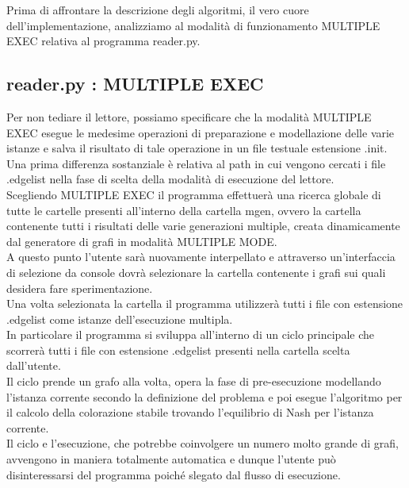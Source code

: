 Prima di affrontare la descrizione degli algoritmi, il vero cuore dell'implementazione, analizziamo al modalità di funzionamento MULTIPLE EXEC relativa al programma reader.py.\\

\subsection{reader.py : MULTIPLE EXEC}
\justify
Per non tediare il lettore, possiamo specificare che la modalità MULTIPLE EXEC esegue le medesime operazioni di preparazione e modellazione delle varie istanze e salva il risultato di tale operazione in un file testuale estensione .init.\\

Una prima differenza sostanziale è relativa al path in cui vengono cercati i file .edgelist nella fase di scelta della modalità di esecuzione del lettore.\\
Scegliendo MULTIPLE EXEC il programma effettuerà una ricerca globale di tutte le cartelle presenti all'interno della cartella mgen, ovvero la cartella contenente tutti i risultati delle varie generazioni multiple, creata dinamicamente dal generatore di grafi in modalità MULTIPLE MODE.\\

A questo punto l'utente sarà nuovamente interpellato e attraverso un'interfaccia di selezione da console dovrà selezionare la cartella contenente i grafi sui quali desidera fare sperimentazione.\\
Una volta selezionata la cartella il programma utilizzerà tutti i file con estensione .edgelist come istanze dell'esecuzione multipla.\\
In particolare il programma si sviluppa all'interno di un ciclo principale che scorrerà tutti i file con estensione .edgelist presenti nella cartella scelta dall'utente.\\

Il ciclo prende un grafo alla volta, opera la fase di pre-esecuzione modellando l'istanza corrente secondo la definizione del problema e poi esegue l'algoritmo per il calcolo della colorazione stabile trovando l'equilibrio di Nash per l'istanza corrente.\\
Il ciclo e l'esecuzione, che potrebbe coinvolgere un numero molto grande di grafi, avvengono in maniera totalmente automatica e dunque l'utente può disinteressarsi del programma poiché slegato dal flusso di esecuzione.\\


